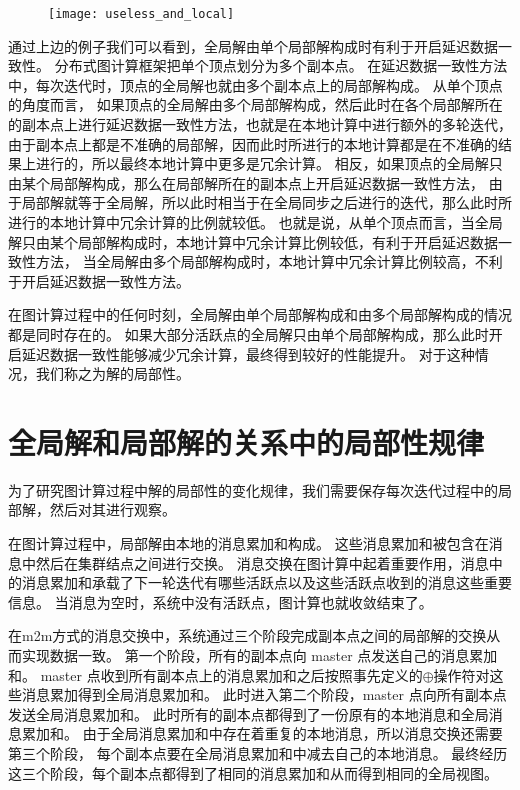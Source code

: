\begin{figure}[!htbp]
\centering
\texttt{[image: useless\_and\_local]}
\label{fig:useless_and_local}
\end{figure}


通过上边的例子我们可以看到，全局解由单个局部解构成时有利于开启延迟数据一致性。
分布式图计算框架把单个顶点划分为多个副本点。
在延迟数据一致性方法中，每次迭代时，顶点的全局解也就由多个副本点上的局部解构成。
从单个顶点的角度而言，
如果顶点的全局解由多个局部解构成，然后此时在各个局部解所在的副本点上进行延迟数据一致性方法，也就是在本地计算中进行额外的多轮迭代，
由于副本点上都是不准确的局部解，因而此时所进行的本地计算都是在不准确的结果上进行的，所以最终本地计算中更多是冗余计算。
相反，如果顶点的全局解只由某个局部解构成，那么在局部解所在的副本点上开启延迟数据一致性方法，
由于局部解就等于全局解，所以此时相当于在全局同步之后进行的迭代，那么此时所进行的本地计算中冗余计算的比例就较低。
也就是说，从单个顶点而言，当全局解只由某个局部解构成时，本地计算中冗余计算比例较低，有利于开启延迟数据一致性方法，
当全局解由多个局部解构成时，本地计算中冗余计算比例较高，不利于开启延迟数据一致性方法。

在图计算过程中的任何时刻，全局解由单个局部解构成和由多个局部解构成的情况都是同时存在的。
如果大部分活跃点的全局解只由单个局部解构成，那么此时开启延迟数据一致性能够减少冗余计算，最终得到较好的性能提升。
对于这种情况，我们称之为解的局部性。

\section{全局解和局部解的关系中的局部性规律}
为了研究图计算过程中解的局部性的变化规律，我们需要保存每次迭代过程中的局部解，然后对其进行观察。

在图计算过程中，局部解由本地的消息累加和构成。
这些消息累加和被包含在消息中然后在集群结点之间进行交换。
消息交换在图计算中起着重要作用，消息中的消息累加和承载了下一轮迭代有哪些活跃点以及这些活跃点收到的消息这些重要信息。
当消息为空时，系统中没有活跃点，图计算也就收敛结束了。

在m2m方式的消息交换中，系统通过三个阶段完成副本点之间的局部解的交换从而实现数据一致。
第一个阶段，所有的副本点向 master 点发送自己的消息累加和。
master 点收到所有副本点上的消息累加和之后按照事先定义的$\oplus$操作符对这些消息累加得到全局消息累加和。
此时进入第二个阶段，master 点向所有副本点发送全局消息累加和。
此时所有的副本点都得到了一份原有的本地消息和全局消息累加和。
由于全局消息累加和中存在着重复的本地消息，所以消息交换还需要第三个阶段，
每个副本点要在全局消息累加和中减去自己的本地消息。
最终经历这三个阶段，每个副本点都得到了相同的消息累加和从而得到相同的全局视图。


